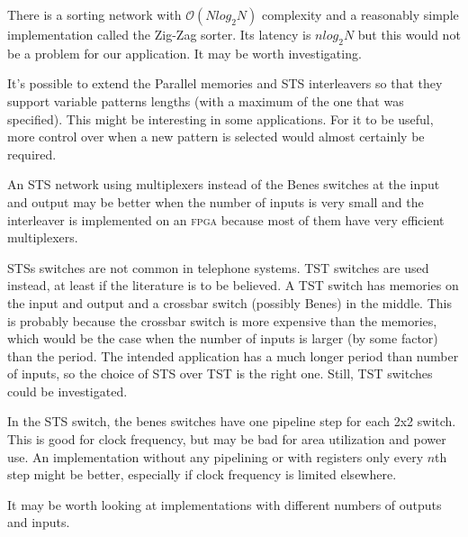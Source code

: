 \documentclass[
	utf8,
	largesmallcaps,
	intlimits,
	widermath,
	sharecounter,
	nobreak,
	definition=marks,
	numbers,
	noparts
]{rtthesis}
\let\textabbr\textsc
\newcommand{\abbrFPGA}{\texorpdfstring{\textabbr{fpga}}{FPGA}\xspace}
\begin{document}
There is a sorting network with $\mathcal{O}(N log_2 N)$ complexity and a
reasonably simple implementation called the Zig-Zag sorter. Its latency is $n
log_2 N$ but this would not be a problem for our application. It may be worth
investigating.

It's possible to extend the Parallel memories and STS interleavers so that they
support variable patterns lengths (with a maximum of the one that was
specified). This might be interesting in some applications. For it to be
useful, more control over when a new pattern is selected would almost certainly
be required.

An STS network using multiplexers instead of the Benes switches at the input
and output may be better when the number of inputs is very small and the
interleaver is implemented on an \abbrFPGA because most of them have very
efficient multiplexers.

STSs switches are not common in telephone systems. TST switches are used
instead, at least if the literature is to be believed. A TST switch has
memories on the input and output and a crossbar switch (possibly Benes) in the
middle. This is probably because the crossbar switch is more expensive than the
memories, which would be the case when the number of inputs is larger (by some
factor) than the period. The intended application has a much longer period than
number of inputs, so the choice of STS over TST is the right one. Still, TST
switches could be investigated.

In the STS switch, the benes switches have one pipeline step for each 2x2
switch. This is good for clock frequency, but may be bad for area utilization
and power use. An implementation without any pipelining or with registers only
every $n$th step might be better, especially if clock frequency is limited
elsewhere.

It may be worth looking at implementations with different numbers of outputs
and inputs.


\end{document}
